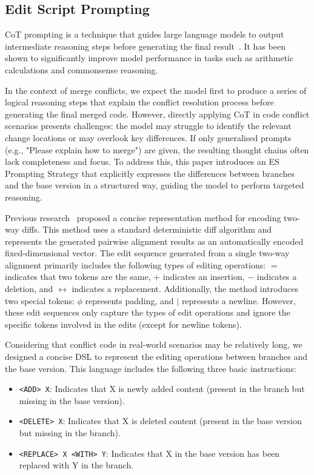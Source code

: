 \documentclass[sigconf,review,anonymous]{acmart}
\begin{document}
\subsection{Edit Script Prompting}
CoT prompting is a technique that guides large language models to output intermediate reasoning steps before generating the final result~\cite{cot}.
It has been shown to significantly improve model performance in tasks such as arithmetic calculations and commonsense reasoning. 

In the context of merge conflicts, we expect the model first to produce a series of logical reasoning steps that explain the conflict resolution process before generating the final merged code.
However, directly applying CoT in code conflict scenarios presents challenges: the model may struggle to identify the relevant change locations or may overlook key differences. 
If only generalised prompts (e.g., "Please explain how to merge") are given, the resulting thought chains often lack completeness and focus. 
To address this, this paper introduces an ES Prompting Strategy that explicitly expresses the differences between branches and the base version in a structured way, guiding the model to perform targeted reasoning.

Previous research~\cite{ltre} proposed a concise representation method for encoding two-way diffs. This method uses a standard deterministic diff algorithm and represents the generated pairwise alignment results as an automatically encoded fixed-dimensional vector. The edit sequence generated from a single two-way alignment primarily includes the following types of editing operations: 
$=$ indicates that two tokens are the same, 
$+$ indicates an insertion, 
$-$ indicates a deletion, and 
$\leftrightarrow$ indicates a replacement. 
Additionally, the method introduces two special tokens: 
$\phi$ represents padding, and $|$ represents a newline.
However, these edit sequences only capture the types of edit operations and ignore the specific tokens involved in the edits (except for newline tokens).

Considering that conflict code in real-world scenarios may be relatively long, we designed a concise DSL to represent the editing operations between branches and the base version. This language includes the following three basic instructions:
\begin{itemize}
    \item \texttt{<ADD> X}: Indicates that X is newly added content (present in the branch but missing in the base version).
    \item \texttt{<DELETE> X}: Indicates that X is deleted content (present in the base version but missing in the branch).
    \item \texttt{<REPLACE> X <WITH> Y}: Indicates that X in the base version has been replaced with Y in the branch.
\end{itemize}
\end{document}
